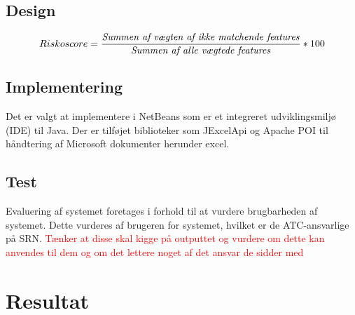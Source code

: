 \section{Design}

\begin{equation}
Riskoscore = \frac{\mbox{\textit{Summen af vægten af ikke matchende features}}}{\mbox{\textit{Summen af alle vægtede features}}} * 100
\end{equation}



\section{Implementering}
Det er valgt at implementere i NetBeans som er et integreret udviklingsmiljø (IDE) til Java. Der er tilføjet biblioteker som JExcelApi og Apache POI til håndtering af Microsoft dokumenter herunder excel.

\section{Test}
Evaluering af systemet foretages i forhold til at vurdere brugbarheden af systemet. Dette vurderes af brugeren for systemet, hvilket er de ATC-ansvarlige på SRN. \textcolor{red}{Tænker at disse skal kigge på outputtet og vurdere om dette kan anvendes til dem og om det lettere noget af det ansvar de sidder med}

\chapter{Resultat}



